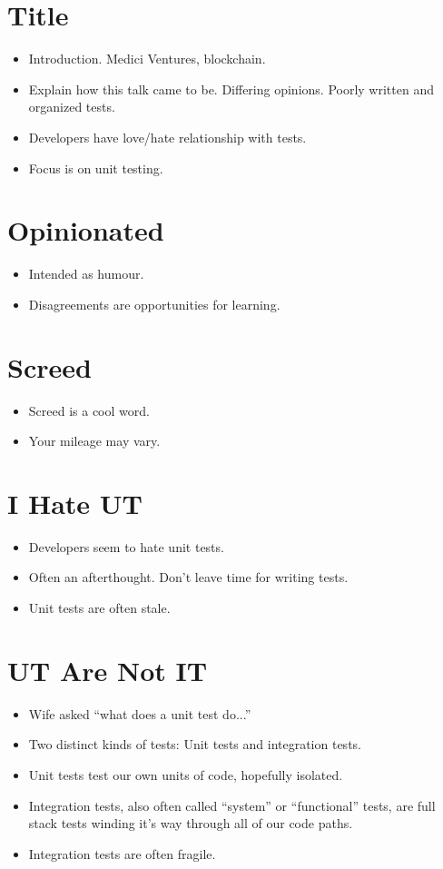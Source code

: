 \documentclass{article}
\begin{document}
\sloppy
\section{Title}
\begin{itemize}
    \item Introduction. Medici Ventures, blockchain.
    \item Explain how this talk came to be. Differing opinions. Poorly written
        and organized tests.
    \item Developers have love/hate relationship with tests.
    \item Focus is on unit testing.
\end{itemize}

\newpage
\section{Opinionated}
\begin{itemize}
    \item Intended as humour.
    \item Disagreements are opportunities for learning.
\end{itemize}

\newpage
\section{Screed}
\begin{itemize}
    \item Screed is a cool word.
    \item Your mileage may vary.
\end{itemize}

\newpage
\section{I Hate UT}
\begin{itemize}
    \item Developers seem to hate unit tests.
    \item Often an afterthought. Don't leave time for writing tests.
    \item Unit tests are often stale.
\end{itemize}

\newpage
\section{UT Are Not IT}
\begin{itemize}
    \item Wife asked ``what does a unit test do...''
    \item Two distinct kinds of tests: Unit tests and integration tests.
    \item Unit tests test our own units of code, hopefully isolated.
    \item Integration tests, also often called ``system'' or ``functional''
        tests, are full stack tests winding it's way through all of our code
        paths.
    \item Integration tests are often fragile.
\end{itemize}
\end{document}
